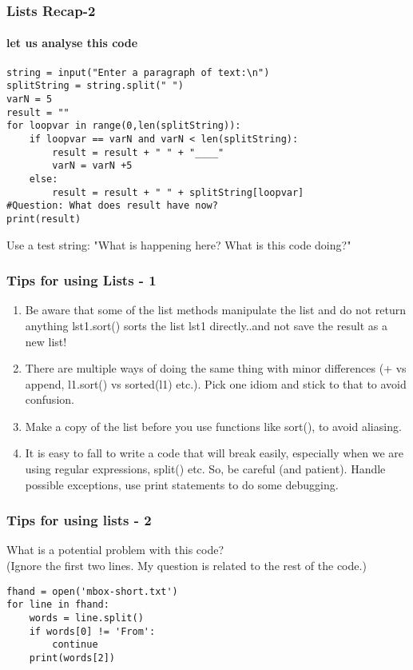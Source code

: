 \documentclass{beamer}
\begin{document}
\begin{frame}[fragile] %
\frametitle{Lists Recap-2}
\framesubtitle{let us analyse this code}
\scriptsize
\begin{verbatim}
string = input("Enter a paragraph of text:\n")
splitString = string.split(" ")
varN = 5
result = ""
for loopvar in range(0,len(splitString)):
    if loopvar == varN and varN < len(splitString):
        result = result + " " + "____"
        varN = varN +5
    else:
        result = result + " " + splitString[loopvar]
#Question: What does result have now?
print(result)
\end{verbatim}
Use a test string: "What is happening here? What is this code doing?"
\end{frame}

\begin{frame}%
\frametitle{Tips for using Lists - 1}
\begin{enumerate}
\item Be aware that some of the list methods manipulate the list and do not return anything lst1.sort() sorts the list lst1 directly..and not save the result as a new list! \pause
\item There are multiple ways of doing the same thing with minor differences (+ vs append, l1.sort() vs sorted(l1) etc.). Pick one idiom and stick to that to avoid confusion.\pause
\item Make a copy of the list before you use functions like sort(), to avoid aliasing. \pause
\item It is easy to fall to write a code that will break easily, especially when we are using regular expressions, split() etc. So, be careful (and patient). Handle possible exceptions, use print statements to do some debugging.
\end{enumerate}
\end{frame}

\begin{frame}[fragile]
\frametitle{Tips for using lists - 2}
What is a potential problem with this code?
\\ (Ignore the first two lines. My question is related to the rest of the code.)
\scriptsize
\begin{verbatim}
fhand = open('mbox-short.txt')
for line in fhand:
    words = line.split()
    if words[0] != 'From': 
        continue
    print(words[2])
\end{verbatim}
\end{frame}
\end{document}
